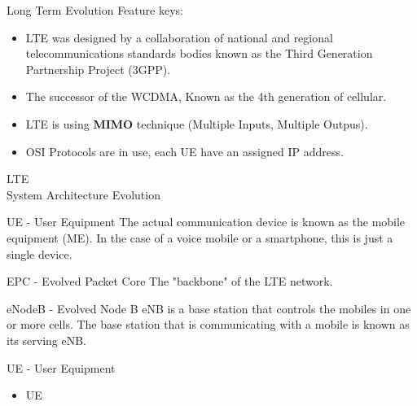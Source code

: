 \documentclass{beamer}
\begin{document}

\begin{frame}{Long Term Evolution}
Feature keys:
\begin{itemize}
    \item LTE was designed by a collaboration of national and regional telecommunications standards bodies known as the Third Generation Partnership Project (3GPP).
    \item The successor of the WCDMA, Known as the 4th generation of cellular.
    \item LTE is using \textbf{MIMO} technique (Multiple Inputs, Multiple Outpus).
    \item OSI Protocols are in use, each UE have an assigned IP address.
\end{itemize}
\end{frame}
\begin{frame}{LTE \\ System Architecture Evolution}
	\begin{block}{UE - User Equipment}
		The actual communication device is known as the mobile equipment (ME). In the
case of a voice mobile or a smartphone, this is just a single device.
	\end{block}
	\pause %
	\begin{block}{EPC - Evolved Packet Core}
	    The "backbone" of the LTE network.
	\end{block}
	\pause %
	\begin{block}{eNodeB - Evolved Node B}
		 eNB is a base station that controls the mobiles in one or more cells.
		 The base station that is communicating with a
mobile is known as its serving eNB.
	\end{block}
\end{frame}
\begin{frame}{UE - User Equipment}
\begin{itemize}
    \item UE
\end{itemize}
\end{frame}
\end{document}
